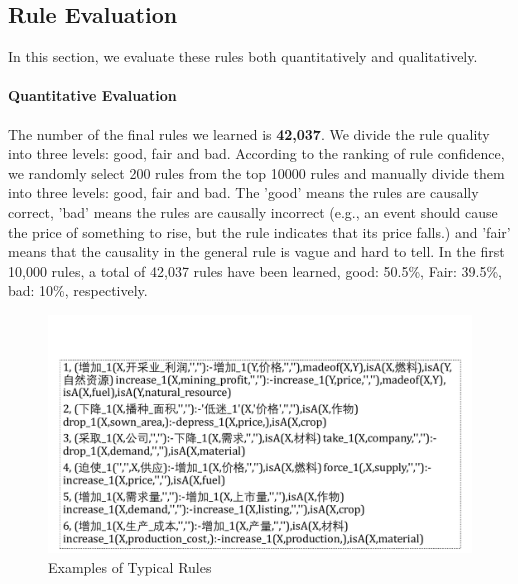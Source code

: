 \subsection{Rule Evaluation}
In this section, we evaluate these rules both quantitatively and qualitatively.
\paragraph{Quantitative Evaluation}
The number of the final rules we learned is \textbf{42,037}. We divide the rule quality into three levels: good, fair and bad. According to the ranking of rule confidence, we randomly select 200 rules from the top 10000 rules and manually divide them into three levels: good, fair and bad. The 'good' means the rules are causally correct, 'bad' means the rules are causally incorrect (e.g., an event should cause the price of something to rise, but the rule indicates that its price falls.) and 'fair' means that the causality in the general rule is vague and hard to tell. In the first 10,000 rules, a total of 42,037 rules have been learned, good: 50.5\%, Fair: 39.5\%, bad: 10\%, respectively.
\begin{figure}[htbp]
	\centering
	\includegraphics[width=0.95\columnwidth]{figures/rules_case}
	\caption{Examples of Typical Rules}
	\label{fig:rules_case}
\end{figure}
